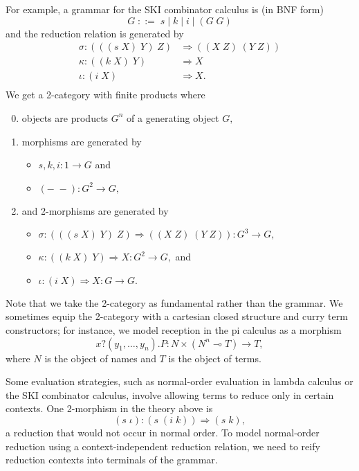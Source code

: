 \documentclass[]{acm_proc_article-sp}
\numberwithin{equation}{subsection}
\begin{document}
For example, a grammar for the SKI combinator calculus is (in BNF form)
\[ G\; ::=\; s\; |\; k\; |\; i\; |\; (G\; G) \]
and the reduction relation is generated by
\[\begin{array}{rl}
  \sigma\colon (((s\; X)\; Y)\; Z) & \Rightarrow ((X\; Z)\; (Y\; Z))\\
  \kappa\colon ((k\; X)\; Y) & \Rightarrow X\\
  \iota\colon (i\; X) & \Rightarrow X.\\
\end{array}\]
We get a 2-category with finite products where
\begin{enumerate}
  \setcounter{enumi}{-1}
  \item objects are products $G^n$ of a generating object $G,$
  \item morphisms are generated by
  \begin{itemize}
    \item $s, k, i\colon 1 \to G$ and
    \item $(-\;-)\colon G^2 \to G,$
  \end{itemize}
  \item and 2-morphisms are generated by
  \begin{itemize}
    \item $\sigma\colon (((s\; X)\; Y)\; Z) \Rightarrow ((X\; Z)\; (Y\; Z)) \colon {G^3 \to G},$
    \item $\kappa\colon ((k\; X)\; Y) \Rightarrow X \colon {G^2 \to G},$ and
    \item $\iota\colon (i\; X) \Rightarrow X \colon {G \to G}.$
  \end{itemize}
\end{enumerate}

Note that we take the 2-category as fundamental rather than the grammar.  We sometimes equip the 2-category with a cartesian closed structure and curry term constructors; for instance, we model reception in the pi calculus as a morphism
\[ x?(y_1, \ldots, y_n).P\colon N \times (N^n \multimap T) \to T, \]
where $N$ is the object of names and $T$ is the object of terms.  

Some evaluation strategies, such as normal-order evaluation in lambda calculus or the SKI combinator calculus, involve allowing terms to reduce only in certain contexts.  One 2-morphism in the theory above is
\[ (s\; \iota)\colon (s\; (i\; k)) \Rightarrow (s\; k),\]
a reduction that would not occur in normal order.  To model normal-order reduction using a context-independent reduction relation, we need to reify reduction contexts into terminals of the grammar.
\end{document}
